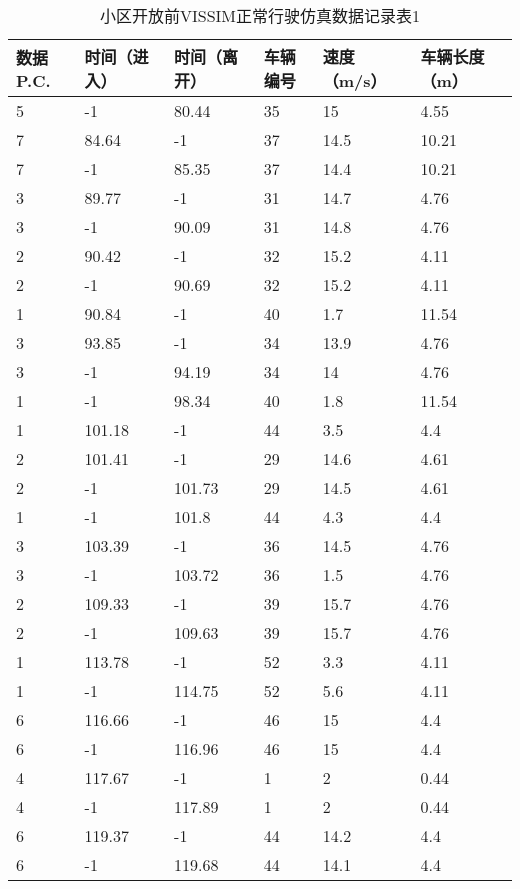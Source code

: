 \begin{table*}[h!]
  \centering
  \small
  \caption{小区开放前VISSIM正常行驶仿真数据记录表1}
  \begin{tabular*}{\linewidth}{p{50pt}<{\centering}p{50pt}<{\centering}
    p{60pt}<{\centering}p{60pt}<{\centering}p{60pt}<{\centering}p{70pt}<{\centering}}
    \toprule
    数据P.C. & 时间（进入） & 时间（离开） & 车辆编号& 速度（m/s） & 车辆长度（m） \\
    \midrule
    5 & -1 & 80.44 & 35 & 15 & 4.55 \\
    7 & 84.64 & -1 & 37 & 14.5 & 10.21 \\
    7 & -1 & 85.35 & 37 & 14.4 & 10.21 \\
    3 & 89.77 & -1 & 31 & 14.7 & 4.76 \\
    3 & -1 & 90.09 & 31 & 14.8 & 4.76 \\
    2 & 90.42 & -1 & 32 & 15.2 & 4.11 \\
    2 & -1 & 90.69 & 32 & 15.2 & 4.11 \\
    1 & 90.84 & -1 & 40 & 1.7 & 11.54 \\
    3 & 93.85 & -1 & 34 & 13.9 & 4.76 \\
    3 & -1 & 94.19 & 34 & 14 & 4.76 \\
    1 & -1 & 98.34 & 40 & 1.8 & 11.54 \\
    1 & 101.18 & -1 & 44 & 3.5 & 4.4 \\
    2 & 101.41 & -1 & 29 & 14.6 & 4.61 \\
    2 & -1 & 101.73 & 29 & 14.5 & 4.61 \\
    1 & -1 & 101.8 & 44 & 4.3 & 4.4 \\
    3 & 103.39 & -1 & 36 & 14.5 & 4.76 \\
    3 & -1 & 103.72 & 36 & 1.5 & 4.76 \\
    2 & 109.33 & -1 & 39 & 15.7 & 4.76 \\
    2 & -1 & 109.63 & 39 & 15.7 & 4.76 \\
    1 & 113.78 & -1 & 52 & 3.3 & 4.11 \\
    1 & -1 & 114.75 & 52 & 5.6 & 4.11 \\
    6 & 116.66 & -1 & 46 & 15 & 4.4 \\
    6 & -1 & 116.96 & 46 & 15 & 4.4 \\
    4 & 117.67 & -1 & 1 & 2 & 0.44 \\
    4 & -1 & 117.89 & 1 & 2 & 0.44 \\
    6 & 119.37 & -1 & 44 & 14.2 & 4.4 \\
    6 & -1 & 119.68 & 44 & 14.1 & 4.4 \\

\end{tabular*}
\end{table*}
